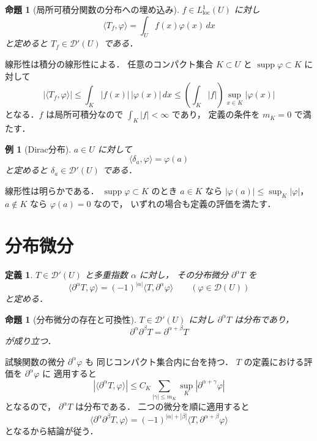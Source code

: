\documentclass[a5paper,10pt,onecolumn]{jsarticle}
\makeatletter
\theoremstyle{mathnotetheorem}
\newtheorem{definition}[theorem]{定義}
\newtheorem{proposition}[theorem]{命題}
\newtheorem{example}[theorem]{例}
\renewcommand{\proofname}{証明}
\renewenvironment{proof}[1][\proofname]{%
  \par\pushQED{\qed}\normalfont\topsep4\p@\@plus2\p@\relax
  \trivlist\item[\hskip\labelsep\bfseries #1]\ignorespaces
}{\popQED\endtrivlist\@endpefalse}
\makeatother
\begin{document}
\begin{proposition}[局所可積分関数の分布への埋め込み]\label{prop:regular}
$f\in L_{\mathrm{loc}}^1(U)$ に対し
\[
 \langle T_f,\varphi\rangle
 =\int_U f(x)\varphi(x)\,dx
\]
と定めると $T_f\in\mathcal D'(U)$ である．
\end{proposition}
\begin{proof}
線形性は積分の線形性による．
任意のコンパクト集合 $K\subset U$ と
$\operatorname{supp}\varphi\subset K$ に対して
\[
 |\langle T_f,\varphi\rangle|
 \le\int_K|f(x)|\,|\varphi(x)|\,dx
 \le\left(\int_K|f|\right)\sup_{x\in K}|\varphi(x)|
\]
となる．$f$ は局所可積分なので $\int_K|f|<\infty$ であり，
定義の条件を $m_K=0$ で満たす．
\end{proof}

\begin{example}[Dirac分布]
$a\in U$ に対して
\[
 \langle\delta_a,\varphi\rangle=\varphi(a)
\]
と定めると $\delta_a\in\mathcal D'(U)$ である．
\end{example}
\begin{proof}
線形性は明らかである．
$\operatorname{supp}\varphi\subset K$ のとき
$a\in K$ なら $|\varphi(a)|\le\sup_K|\varphi|$，
$a\notin K$ なら $\varphi(a)=0$ なので，
いずれの場合も定義の評価を満たす．
\end{proof}

\section{分布微分}

\begin{definition}
$T\in\mathcal D'(U)$ と多重指数 $\alpha$ に対し，
その\emph{分布微分} $\partial^\alpha T$ を
\[
 \langle\partial^\alpha T,\varphi\rangle
 =(-1)^{|\alpha|}
 \langle T,\partial^\alpha\varphi\rangle
 \qquad(\varphi\in\mathcal D(U))
\]
と定める．
\end{definition}

\begin{proposition}[分布微分の存在と可換性]\label{prop:dist-derivative}
$T\in\mathcal D'(U)$ に対し
$\partial^\alpha T$ は分布であり，
\[
 \partial^\alpha\partial^\beta T
 =\partial^{\alpha+\beta}T
\]
が成り立つ．
\end{proposition}
\begin{proof}
試験関数の微分 $\partial^\alpha\varphi$ も
同じコンパクト集合内に台を持つ．
$T$ の定義における評価を $\partial^\alpha\varphi$ に
適用すると
\[
 |\langle\partial^\alpha T,\varphi\rangle|
 \le C_K\sum_{|\gamma|\le m_K}
 \sup_K|\partial^{\alpha+\gamma}\varphi|
\]
となるので，
$\partial^\alpha T$ は分布である．
二つの微分を順に適用すると
\[
 \langle\partial^\alpha\partial^\beta T,\varphi\rangle
 =(-1)^{|\alpha|+|\beta|}
 \langle T,\partial^{\alpha+\beta}\varphi\rangle
\]
となるから結論が従う．
\end{proof}
\end{document}
